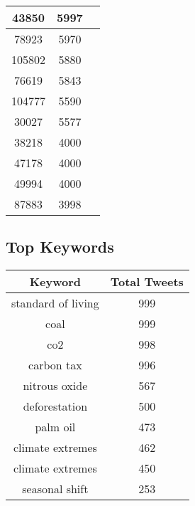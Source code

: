 \documentclass{article}\usepackage[T1]{fontenc}
\begin{document}
\begin{tabular}{|c|c|c|}
 \hline
43850 & 5997\\ 
 \hline
78923 & 5970\\ 
 \hline
105802 & 5880\\ 
 \hline
76619 & 5843\\ 
 \hline
104777 & 5590\\ 
 \hline
30027 & 5577\\ 
 \hline
38218 & 4000\\ 
 \hline
47178 & 4000\\ 
 \hline
49994 & 4000\\ 
 \hline
87883 & 3998\\ 
 \hline
\end{tabular}\subsection*{Top Keywords}\begin{tabular}{|c|c|}         \hline         Keyword & Total Tweets \\ 
 \hline
standard of living & 999\\ 
 \hline
coal & 999\\ 
 \hline
co2 & 998\\ 
 \hline
carbon tax & 996\\ 
 \hline
nitrous oxide & 567\\ 
 \hline
deforestation & 500\\ 
 \hline
palm oil & 473\\ 
 \hline
climate extremes & 462\\ 
 \hline
climate extremes & 450\\ 
 \hline
seasonal shift & 253\\ 
 \hline
\end{tabular}
\end{document}
